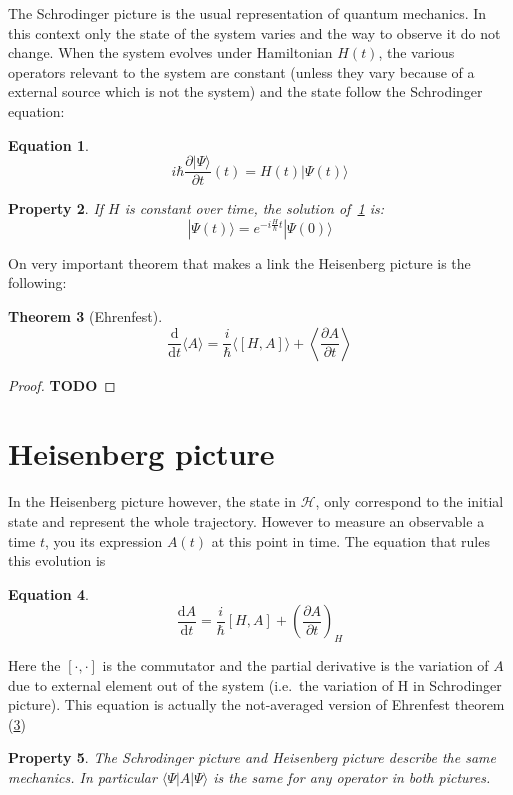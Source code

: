 \documentclass[10pt]{report}
\theoremstyle{plain}
\newtheorem{thm}{Theorem}[chapter]
\newtheorem{prop}[thm]{Property}
\theoremstyle{definition}
\newtheorem{eqn}[thm]{Equation}
\theoremstyle{remark}
\newcommand{\TODO}{\textbf{TODO}}
\newcommand{\ket}[1]{|#1\rangle}
\newcommand{\bra}[1]{\langle#1|}
\newcommand{\dd}{\mathrm{d}}
\newcommand{\der}[2]{\frac{\dd{#1}}{\dd{#2}}}
\newcommand{\dpar}[2]{\frac{\partial{#1}}{\partial{#2}}}
\begin{document}
The Schrodinger picture is the usual representation of quantum mechanics. In
this context only the state of the system varies and the way to observe it do
not change. When the system evolves under Hamiltonian $H(t)$,
the various operators relevant to the system are constant (unless they vary
because of a external source which is not the system) and the
state follow the Schrodinger equation:
\begin{eqn}\label{eqn:schro}
\[i\hbar \frac{\partial \ket \Psi}{\partial t} (t) = H(t) \ket {\Psi(t)} \]
\end{eqn}

\begin{prop}
  If $H$ is constant over time, the solution of~\cref{eqn:schro} is:
  \[ \ket {\Psi(t)} = e^{-i\frac H\hbar t}\ket{\Psi(0)}\]
\end{prop}

On very important theorem that makes a link the Heisenberg picture is the
following:

\begin{thm}[Ehrenfest]\label{thm:ehren}
  \[\der{}t\langle A\rangle = \frac i\hbar\langle[H,A]\rangle + \left\langle\dpar
      A t \right\rangle\]
\end{thm}

\begin{proof}
  \TODO
\end{proof}


\section{Heisenberg picture}

In the Heisenberg picture however, the state in $\mathcal{H}$, only correspond
to the initial state and represent the whole trajectory. However to measure an
observable a time $t$, you its expression $A(t)$ at this point in time. The
equation that rules this evolution is



\begin{eqn}
  \[\der At   = \frac i {\hbar}[H,A] + {\left(\dpar At \right)}_{\!\!H}\]
\end{eqn}

Here the $[\cdot,\cdot]$ is the commutator and the partial derivative is the
variation of $A$ due to external element out of the system (i.e.~the variation
of H in Schrodinger picture). This equation is actually the not-averaged version
of Ehrenfest theorem (\ref{thm:ehren})

\begin{prop}
  The Schrodinger picture and Heisenberg picture describe the same mechanics. In
  particular $\bra \Psi A \ket \Psi$ is the same for any operator in both pictures.
\end{prop}
\end{document}
